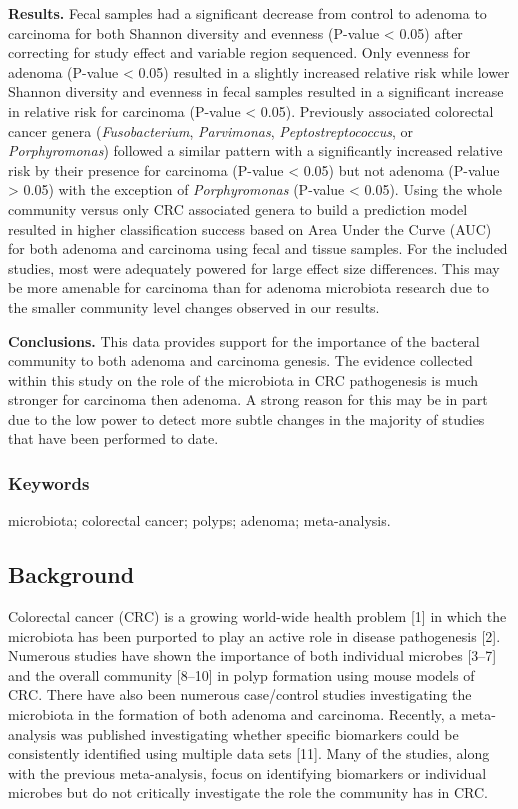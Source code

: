\documentclass[12pt,]{article}
\begin{document}
\textbf{Results.} Fecal samples had a significant decrease from control
to adenoma to carcinoma for both Shannon diversity and evenness (P-value
\textless{} 0.05) after correcting for study effect and variable region
sequenced. Only evenness for adenoma (P-value \textless{} 0.05) resulted
in a slightly increased relative risk while lower Shannon diversity and
evenness in fecal samples resulted in a significant increase in relative
risk for carcinoma (P-value \textless{} 0.05). Previously associated
colorectal cancer genera (\emph{Fusobacterium}, \emph{Parvimonas},
\emph{Peptostreptococcus}, or \emph{Porphyromonas}) followed a similar
pattern with a significantly increased relative risk by their presence
for carcinoma (P-value \textless{} 0.05) but not adenoma (P-value
\textgreater{} 0.05) with the exception of \emph{Porphyromonas} (P-value
\textless{} 0.05). Using the whole community versus only CRC associated
genera to build a prediction model resulted in higher classification
success based on Area Under the Curve (AUC) for both adenoma and
carcinoma using fecal and tissue samples. For the included studies, most
were adequately powered for large effect size differences. This may be
more amenable for carcinoma than for adenoma microbiota research due to
the smaller community level changes observed in our results.

\textbf{Conclusions.} This data provides support for the importance of
the bacteral community to both adenoma and carcinoma genesis. The
evidence collected within this study on the role of the microbiota in
CRC pathogenesis is much stronger for carcinoma then adenoma. A strong
reason for this may be in part due to the low power to detect more
subtle changes in the majority of studies that have been performed to
date.

\subsubsection{Keywords}\label{keywords}

microbiota; colorectal cancer; polyps; adenoma; meta-analysis.

\newpage

\subsection{Background}\label{background}

Colorectal cancer (CRC) is a growing world-wide health problem {[}1{]}
in which the microbiota has been purported to play an active role in
disease pathogenesis {[}2{]}. Numerous studies have shown the importance
of both individual microbes {[}3--7{]} and the overall community
{[}8--10{]} in polyp formation using mouse models of CRC. There have
also been numerous case/control studies investigating the microbiota in
the formation of both adenoma and carcinoma. Recently, a meta-analysis
was published investigating whether specific biomarkers could be
consistently identified using multiple data sets {[}11{]}. Many of the
studies, along with the previous meta-analysis, focus on identifying
biomarkers or individual microbes but do not critically investigate the
role the community has in CRC.
\end{document}
